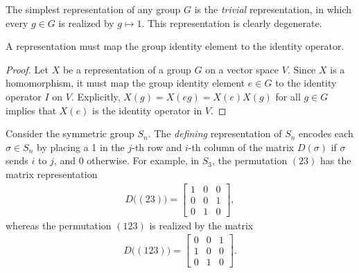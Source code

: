 \begin{example}
    The simplest representation of any group $G$ is the \textit{trivial} representation, in which every $g\in G$ is realized by $g\mapsto 1$. This representation is clearly degenerate.
\end{example}

\begin{remark}
    A representation must map the group identity element to the identity operator.
\end{remark}
\begin{proof}
    Let $X$ be a representation of a group $G$ on a vector space $V$. Since $X$ is a homomorphism, it must map the group identity element $e\in G$ to the identity operator $I$ on $V$. Explicitly, $X(g) = X(eg) = X(e)X(g)$ for all $g\in G$ implies that $X(e)$ is the identity operator in $V$.
\end{proof}

\begin{example}
    Consider the symmetric group $S_n$. The \textit{defining} representation of $S_n$ encodes each $\sigma\in S_n$ by placing a 1 in the $j$-th row and $i$-th column of the matrix $D(\sigma)$ if $\sigma$ sends $i$ to $j$, and 0 otherwise. For example, in $S_3$, the permutation $(23)$ has the matrix representation
    \begin{align*}
        D\big((23)\big) = \begin{bmatrix} 1 & 0 & 0 \\ 0 & 0 & 1 \\ 0 & 1 & 0 \end{bmatrix},
    \end{align*}
    whereas the permutation $(123)$ is realized by the matrix
    \begin{align*}
        D\big((123)\big) = \begin{bmatrix} 0 & 0 & 1 \\ 1 & 0 & 0 \\ 0 & 1 & 0 \end{bmatrix}.
    \end{align*}
\end{example}


